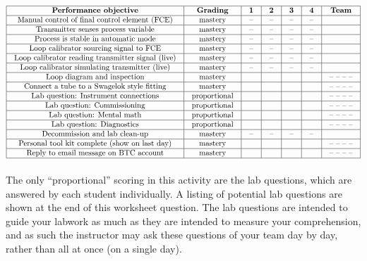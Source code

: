 $$\vbox{\offinterlineskip
\halign{\strut
\vrule \quad\hfil # \ \hfil & 
\vrule \quad\hfil # \ \hfil & 
\vrule \quad\hfil # \ \hfil & 
\vrule \quad\hfil # \ \hfil & 
\vrule \quad\hfil # \ \hfil & 
\vrule \quad\hfil # \ \hfil & 
\vrule \quad\hfil # \ \hfil \vrule \cr
\noalign{\hrule}
%
{\bf Performance objective} & {\bf Grading} & {\bf 1} & {\bf 2} & {\bf 3} & {\bf 4} & {\bf Team} \cr
%
\noalign{\hrule}
%
Manual control of final control element (FCE) & mastery & -- & -- & -- & -- &  \cr
%
\noalign{\hrule}
%
Transmitter senses process variable & mastery & -- & -- & -- & -- &  \cr
%
\noalign{\hrule}
%
Process is stable in automatic mode & mastery & -- & -- & -- & -- &  \cr
%
\noalign{\hrule}
%
Loop calibrator sourcing signal to FCE & mastery & -- & -- & -- & -- &  \cr
%
\noalign{\hrule}
%
Loop calibrator reading transmitter signal (live) & mastery & -- & -- & -- & -- &  \cr
%
\noalign{\hrule}
%
Loop calibrator simulating transmitter (live) & mastery & -- & -- & -- & -- &  \cr
%
\noalign{\hrule}
%
Loop diagram and inspection & mastery &  &  &  &  & -- -- -- -- \cr
%
\noalign{\hrule}
%
Connect a tube to a Swagelok style fitting & mastery &  &  &  &  & -- -- -- -- \cr
%
\noalign{\hrule}
%
Lab question: Instrument connections & proportional &  &  &  &  & -- -- -- -- \cr
%
\noalign{\hrule}
%
Lab question: Commissioning & proportional &  &  &  &  & -- -- -- -- \cr
%
\noalign{\hrule}
%
Lab question: Mental math & proportional &  &  &  &  & -- -- -- -- \cr
%
\noalign{\hrule}
%
Lab question: Diagnostics & proportional &  &  &  &  & -- -- -- -- \cr
%
\noalign{\hrule}
%
Decommission and lab clean-up & mastery & -- & -- & -- & -- &  \cr
%
\noalign{\hrule}
%
Personal tool kit complete (show on last day) & mastery &  &  &  &  & -- -- -- -- \cr
%
\noalign{\hrule}
%
Reply to email message on BTC account & mastery &  &  &  &  & -- -- -- -- \cr
%
\noalign{\hrule}
} %
}$$ %

The only ``proportional'' scoring in this activity are the lab questions, which are answered by each student individually.  A listing of potential lab questions are shown at the end of this worksheet question.  The lab questions are intended to guide your labwork as much as they are intended to measure your comprehension, and as such the instructor may ask these questions of your team day by day, rather than all at once (on a single day).

